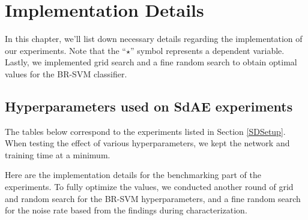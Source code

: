 %
%
%
%
%

\chapter{Implementation Details}
\label{AppendixImplementation}

\par In this chapter, we'll list down necessary details regarding the
implementation of our experiments. Note that the ``$\star$'' symbol represents
a dependent variable. Lastly, we implemented grid search and a fine random
search to obtain optimal values for the BR-SVM classifier.

\section*{Hyperparameters used on SdAE experiments}
\par The tables below correspond to the experiments listed in Section
\ref{SDSetup}. When testing the effect of various hyperparameters,
we kept the network and training time at a minimum.



\par Here are the implementation details for the benchmarking part of the
experiments. To fully optimize the values, we conducted another round of grid
and random search for the BR-SVM hyperparameters, and a fine random search
for the noise rate based from the findings during characterization.

